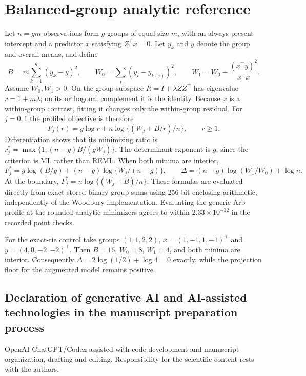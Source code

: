 \documentclass[preprint,11pt,numbers]{elsarticle}
\theoremstyle{remark}\newtheorem{remark}[theorem]{Remark}
\begin{document}
\section{Balanced-group analytic reference}\label{app:balanced}
Let $n=gm$ observations form $g$ groups of equal size $m$, with an always-present
intercept and a predictor $x$ satisfying $Z^\top x=0$. Let $\bar y_k$ and
$\bar y$ denote the group and overall means, and define
\[
B=m\sum_{k=1}^g(\bar y_k-\bar y)^2,\qquad
W_0=\sum_i(y_i-\bar y_{k(i)})^2,\qquad
W_1=W_0-\frac{(x^\top y)^2}{x^\top x}.
\]
Assume $W_0,W_1>0$. On the group subspace $R=I+\lambda ZZ^\top$ has eigenvalue
$r=1+m\lambda$; on its orthogonal complement it is the identity.
Because $x$ is a within-group contrast, fitting it changes only the within-group
residual. For $j=0,1$ the profiled objective is therefore
\[
F_j(r)=g\log r+n\log\{(W_j+B/r)/n\},\qquad r\geq1.
\]
Differentiation shows that its minimizing ratio is
$r_j^*=\max\{1,(n-g)B/(gW_j)\}$. The determinant exponent is $g$, since the
criterion is ML rather than REML. When both minima are interior,
\[
F_j^*=g\log(B/g)+(n-g)\log\{W_j/(n-g)\},\qquad
\Delta=(n-g)\log(W_1/W_0)+\log n.
\]
At the boundary, $F_j^*=n\log\{(W_j+B)/n\}$. These formulas are evaluated
directly from exact stored binary group sums using 256-bit enclosing arithmetic,
independently of the Woodbury implementation. Evaluating the generic Arb
profile at the rounded analytic minimizers agrees to within
$2.33\times10^{-32}$ in the recorded point checks.

For the exact-tie control take groups $(1,1,2,2)$,
$x=(1,-1,1,-1)^\top$ and $y=(4,0,-2,-2)^\top$.
Then $B=16$, $W_0=8$, $W_1=4$, and both minima are interior.
Consequently $\Delta=2\log(1/2)+\log4=0$ exactly, while the projection
floor for the augmented model remains positive.

\begin{samepage}
\section*{Declaration of generative AI and AI-assisted technologies in the manuscript preparation process}
OpenAI ChatGPT/Codex assisted with code development and manuscript organization,
drafting and editing. Responsibility for the scientific content rests with
the authors.
\end{samepage}
\end{document}
